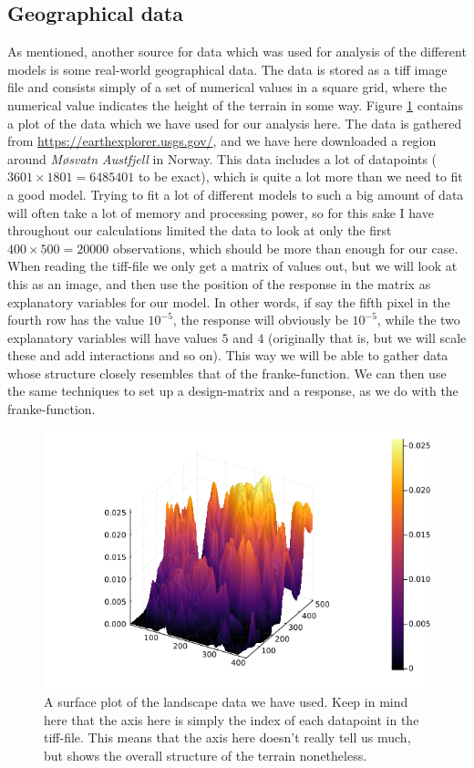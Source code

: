\documentclass{article}
\begin{document}
\subsection{Geographical data}
As mentioned, another source for data which was used for analysis of the
different models is some real-world geographical data. The data is stored as a
tiff image file and consists simply of a set of numerical values in a square
grid, where the numerical value indicates the height of the terrain in some way.
Figure \ref{landscape-plot} contains a plot of the data which we have used for
our analysis here.  The data is gathered from
\url{https://earthexplorer.usgs.gov/}, and we have here downloaded a region
around \textit{Møsvatn Austfjell} in Norway. This data includes a lot of
datapoints ($3601\times 1801 = 6485401$ to be exact), which is quite a lot more
than we need to fit a good model. Trying to fit a lot of different models to
such a big amount of data will often take a lot of memory and processing power,
so for this sake I have throughout our calculations limited the data to look at
only the first $400\times 500 = 20000$ observations, which should be more than
enough for our case. When reading the tiff-file we only get a matrix of values
out, but we will look at this as an image, and then use the position of the
response in the matrix as explanatory variables for our model. In other words,
if say the fifth pixel in the fourth row has the value $10^{-5}$, the response
will obviously be $10^{-5}$, while the two explanatory variables will have
values $5$ and $4$ (originally that is, but we will scale these and add
interactions and so on).  This way we will be able to gather data whose
structure closely resembles that of the franke-function. We can then use the
same techniques to set up a design-matrix and a response, as we do with the
franke-function.

\begin{figure}
    \centerline{\includegraphics[scale=0.5]{landscapesurface}}
    \caption{A surface plot of the landscape data we have used. Keep in mind
        here that the axis here is simply the index of each datapoint in the
        tiff-file. This means that the axis here doesn't really tell us much, but
        shows the overall structure of the terrain nonetheless.}
    \label{landscape-plot}
\end{figure}
\end{document}
